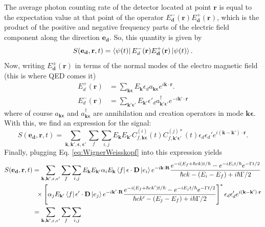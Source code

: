 \documentclass[11pt]{article}
\newcommand{\al}{\alpha}
\newcommand{\f}[2]{\frac{#1}{#2}}
\newcommand{\lb}{\left[}
\newcommand{\rb}{\right]}
\begin{document}
\begin{appendices}
The average photon counting rate of the detector located at point $\mathbf{r}$ is equal to the expectation value at that point of the operator $E^-_\mathbf{d}(\mathbf{r}) E^+_\mathbf{d}(\mathbf{r})$, which is the product of the positive and negative frequency parts of the electric field component along the direction $\mathbf{e_d}$. So, this quantity is given by 
\begin{equation*}
S(\mathbf{e_d}, \mathbf{r},t) = \bra{\psi(t)} E_d^-(\mathbf{r}) E_\mathbf{d}^+(\mathbf{r}) \ket{\psi(t)}.
\end{equation*}
Now, writing $E_\mathbf{d}^{\pm}(\mathbf{r})$ in terms of the normal modes of the electro magnetic field (this is where QED comes it)
\begin{align*}
E_d^+(\mathbf{r}) &= \sum_{\mathbf{k\epsilon}} E_\mathbf{k} \epsilon_d a_{\mathbf{k\epsilon}} e^{i\mathbf{k}\cdot \mathbf{r}}. \\
E_d^-(\mathbf{r}) &= \sum_{\mathbf{k'\epsilon'}} E_{\mathbf{k'}} \epsilon'_d a^\dagger_{\mathbf{k'\epsilon'}} e^{-i\mathbf{k'}\cdot \mathbf{r}}
\end{align*}
where of course $a_{\mathbf{k\epsilon}}$ and $a^\dagger_{\mathbf{k\epsilon}}$ are annihilation and creation operators in mode $\mathbf{k\epsilon}$. With this, we find an expression for the signal:
\begin{equation*}
S(\mathbf{e_d}, \mathbf{r},t) = \sum_{\mathbf{k,k',\epsilon,\epsilon'}}\sum_f \sum_{i,j} E_\mathbf{k} E_{\mathbf{k'}} C_{f,\mathbf{k\epsilon}}^{(i)}(t) C_{f,\mathbf{k'\epsilon'}}^{(j)*}(t) \epsilon_d \epsilon_d' e^{i(\mathbf{k-k'})\cdot \mathbf{r}}.
\end{equation*}
Finally, plugging Eq. \ref{eq:WignerWeisskopf} into this expression yields
\begin{align}
S(\mathbf{e_d}, \mathbf{r},t) 
&= \sum_{\mathbf{k,k',\epsilon,\epsilon'}}\sum_f \sum_{i,j} 
E_\mathbf{k} E_{\mathbf{k'}} \al_i E_\mathbf{k} \bra{f} \mathbf{\epsilon}\cdot \mathbf{D} \ket{e_i} e^{-i\mathbf{k}\cdot \mathbf{R}} \f{e^{-i(E_f + \hbar c k)t/\hbar}  -e^{-iE_i t/\hbar}e^{-\Gamma t / 2}  }{\hbar c k - (E_i - E_f) + i\hbar \Gamma/2}\nonumber\\
&\,\,\,\times  \lb \al_j E_\mathbf{k'} \bra{f} \mathbf{\epsilon'}\cdot \mathbf{D} \ket{e_j} e^{-i\mathbf{k'}\cdot \mathbf{R}} \f{e^{-i(E_f + \hbar c k')t/\hbar}  -e^{-iE_j t/\hbar}e^{-\Gamma t / 2}  }{\hbar c k' - (E_j - E_f) + i\hbar \Gamma/2}\rb^* \epsilon_d \epsilon_d' e^{i(\mathbf{k-k'})\cdot \mathbf{r}}\nonumber\\
&= \sum_{\mathbf{k,k',\epsilon,\epsilon'}}\sum_f \sum_{i,j} 

\end{align}
\end{appendices}
\end{document}
